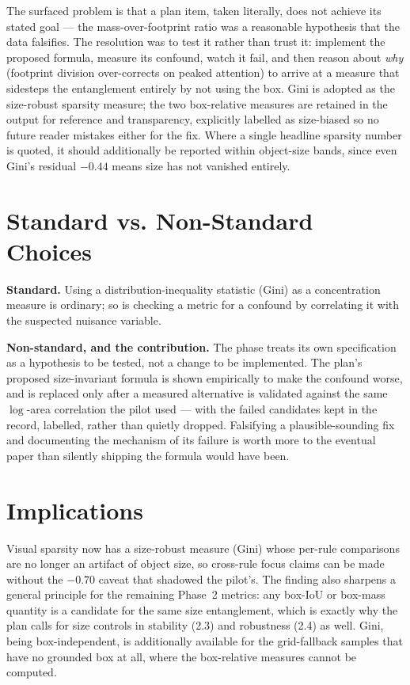 The surfaced problem is that a plan item, taken literally, does not achieve its stated goal --- the
mass-over-footprint ratio was a reasonable hypothesis that the data falsifies. The resolution was to
test it rather than trust it: implement the proposed formula, measure its confound, watch it fail,
and then reason about \emph{why} (footprint division over-corrects on peaked attention) to arrive at a
measure that sidesteps the entanglement entirely by not using the box. Gini is adopted as the
size-robust sparsity measure; the two box-relative measures are retained in the output for reference
and transparency, explicitly labelled as size-biased so no future reader mistakes either for the fix.
Where a single headline sparsity number is quoted, it should additionally be reported within
object-size bands, since even Gini's residual $-0.44$ means size has not vanished entirely.

\section{Standard vs. Non-Standard Choices}

\textbf{Standard.} Using a distribution-inequality statistic (Gini) as a concentration measure is
ordinary; so is checking a metric for a confound by correlating it with the suspected nuisance
variable.

\textbf{Non-standard, and the contribution.} The phase treats its own specification as a hypothesis to
be tested, not a change to be implemented. The plan's proposed size-invariant formula is shown
empirically to make the confound worse, and is replaced only after a measured alternative is validated
against the same $\log$-area correlation the pilot used --- with the failed candidates kept in the
record, labelled, rather than quietly dropped. Falsifying a plausible-sounding fix and documenting the
mechanism of its failure is worth more to the eventual paper than silently shipping the formula would
have been.

\section{Implications}

Visual sparsity now has a size-robust measure (Gini) whose per-rule comparisons are no longer an
artifact of object size, so cross-rule focus claims can be made without the $-0.70$ caveat that shadowed
the pilot's. The finding also sharpens a general principle for the remaining Phase~2 metrics: any
box-IoU or box-mass quantity is a candidate for the same size entanglement, which is exactly why the
plan calls for size controls in stability (2.3) and robustness (2.4) as well. Gini, being
box-independent, is additionally available for the grid-fallback samples that have no grounded box at
all, where the box-relative measures cannot be computed.
